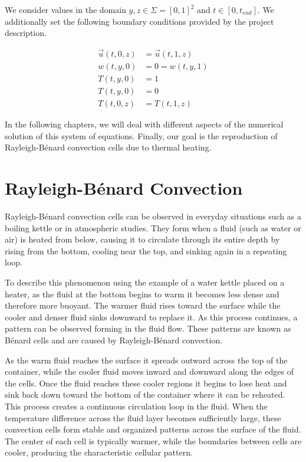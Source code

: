 We consider values in the domain $y,z \in \Sigma = [0,1]^2$ and $t \in [0, t_{end}]$.
We additionally set the following boundary conditions provided by the project description. 


\begin{align}
\vec u (t,0,z) &= \vec u (t,1,z) \\
w(t,y,0) &= 0 = w(t,y,1) \\
T(t,y,0) &= 1 \\
T(t,y,0) &= 0 \\
T(t,0,z) &= T(t,1,z) 
\end{align}

In the following chapters, we will deal with different aspects of the numerical solution of this system of equations.
Finally, our goal is the reproduction of Rayleigh-B\'{e}nard convection cells due to thermal heating.






\section{Rayleigh-B\'{e}nard Convection}

Rayleigh-B\'{e}nard convection cells can be observed in everyday situations such as a boiling kettle or in atmospheric studies. They form when a fluid (such as water or air) is heated from below, causing it to circulate through its entire depth by rising from the bottom, cooling near the top, and sinking again in a repeating loop.

To describe this phenomenon using the example of a water kettle placed on a heater, as the fluid at the bottom begins to warm it becomes less dense and therefore more buoyant. The warmer fluid rises toward the surface while the cooler and denser fluid sinks downward to replace it. As this process continues, a pattern can be observed forming in the fluid flow. These patterns are known as B\'{e}nard cells and are caused by Rayleigh-B\'{e}nard convection.

As the warm fluid reaches the surface it spreads outward across the top of the container, while the cooler fluid moves inward and downward along the edges of the cells. Once the fluid reaches these cooler regions it begins to lose heat and sink back down toward the bottom of the container where it can be reheated. This process creates a continuous circulation loop in the fluid. When the temperature difference across the fluid layer becomes sufficiently large, these convection cells form stable and organized patterns across the surface of the fluid. The center of each cell is typically warmer, while the boundaries between cells are cooler, producing the characteristic cellular pattern.

